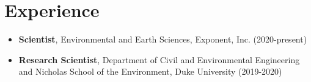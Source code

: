 \documentclass[letterpaper,10pt]{article}
\begin{document}
\section{Experience}
\begin{itemize}
\item {\bfseries Scientist}, Environmental and Earth Sciences, Exponent, Inc. (2020-present)
\item {\bfseries Research Scientist}, Department of Civil and Environmental Engineering and Nicholas School of the Environment, Duke University (2019-2020)
\end{itemize}
\end{document}
